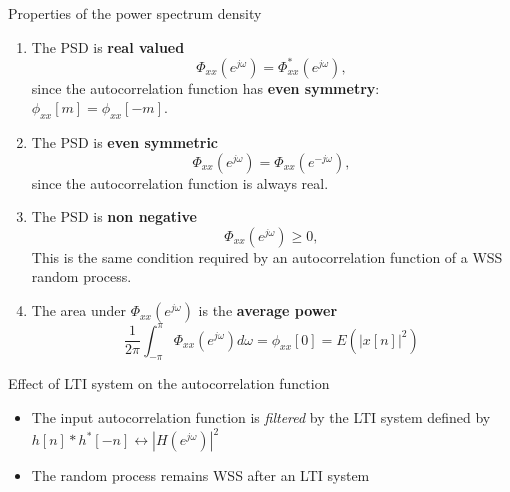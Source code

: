 \documentclass[10pt]{beamer}
\begin{document}
\begin{frame}{Properties of the power spectrum density}

\begin{enumerate} 
	\item The PSD is \textbf{real valued}
	\begin{equation*}
	\Phi_{xx}(e^{j\omega}) = \Phi^*_{xx}(e^{j\omega}),
	\end{equation*}
	since the autocorrelation function has\textbf{ even symmetry}: $\phi_{xx}[m] = \phi_{xx}[-m]$.
	
	\item The PSD is \textbf{even symmetric} 
	\begin{equation*}
	\Phi_{xx}(e^{j\omega}) = \Phi_{xx}(e^{-j\omega}),
	\end{equation*}
	since the autocorrelation function is always real. 
	
	\item The PSD is \textbf{non negative} 
	\begin{equation*}
	\Phi_{xx}(e^{j\omega}) \geq 0,
	\end{equation*}
	This is the same condition required by an autocorrelation function of a WSS random process.
	
	\item The area under $\Phi_{xx}(e^{j\omega})$ is the \textbf{average power}
	\begin{equation*}
	\frac{1}{2\pi}\int_{-\pi}^{\pi} \Phi_{xx}(e^{j\omega})d\omega = \phi_{xx}[0] = E(|x[n]|^2)
	\end{equation*}
	
\end{enumerate} 

\end{frame}

\begin{frame}{Effect of LTI system on the autocorrelation function}
\begin{center}
	\resizebox{0.8\linewidth}{!}{}
\end{center}

\begin{itemize}
	\item The input autocorrelation function is \textit{filtered} by the LTI system defined by $h[n]\ast h^*[-n] \leftrightarrow |H(e^{j\omega})|^2$ 
	\item The random process remains WSS after an LTI system
\end{itemize}

\end{frame}
\end{document}
